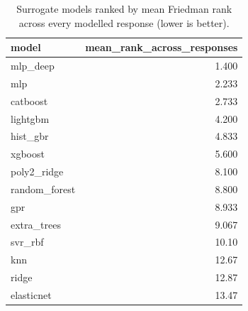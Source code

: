 \begin{table}[!t]
\centering
\caption{Surrogate models ranked by mean Friedman rank across every modelled response (lower is better).}
\label{tab:statistics_surrogate_overall_main}
\footnotesize
\begin{tabular}{lr}
\toprule
model & mean\_rank\_across\_responses \\
\midrule
mlp\_deep & 1.400 \\
mlp & 2.233 \\
catboost & 2.733 \\
lightgbm & 4.200 \\
hist\_gbr & 4.833 \\
xgboost & 5.600 \\
poly2\_ridge & 8.100 \\
random\_forest & 8.800 \\
gpr & 8.933 \\
extra\_trees & 9.067 \\
svr\_rbf & 10.10 \\
knn & 12.67 \\
ridge & 12.87 \\
elasticnet & 13.47 \\
\bottomrule
\end{tabular}
\end{table}
